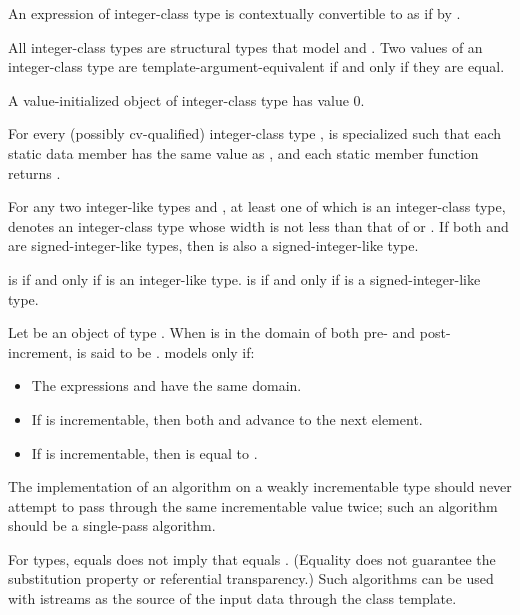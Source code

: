 \pnum
An expression  of integer-class type  is
contextually convertible to 
as if by .

\pnum
All integer-class types are structural types that model
 and
.
Two values of an integer-class type are template-argument-equivalent
if and only if they are equal.

\pnum
A value-initialized object of integer-class type has value 0.

\pnum
For every (possibly cv-qualified) integer-class type ,
 is specialized such that
each static data member 
has the same value as , and
each static member function 
returns .

\pnum
For any two integer-like types  and ,
at least one of which is an integer-class type,
 denotes an integer-class type
whose width is not less than that of  or .
If both  and  are signed-integer-like types,
then  is also a signed-integer-like type.

\pnum
{} is 
if and only if  is an integer-like type.
 is 
if and only if  is a signed-integer-like type.

\pnum
Let  be an object of type . When  is in the domain of
both pre- and post-increment,  is said to be .
 models  only if:
\begin{itemize}
\item The expressions  and  have the same domain.
\item If  is incrementable, then both 
  and  advance  to the next element.
\item If  is incrementable, then
   is equal to
  .
\end{itemize}

\pnum
\recommended
The implementation of an algorithm on a weakly incrementable type
should never attempt to pass through the same incrementable value twice;
such an algorithm should be a single-pass algorithm.
\begin{note}
For  types,  equals  does not imply that 
equals . (Equality does not guarantee the substitution property or referential
transparency.)
Such algorithms
can be used with istreams as the source of the input data through the  class
template.
\end{note}


